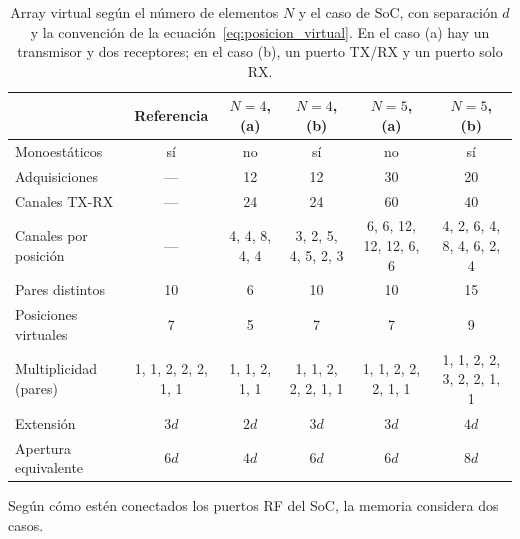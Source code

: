 \documentclass[11pt,a4paper]{article}
\begin{document}
\begin{table}[!htb]
    \centering
    \caption{Array virtual según el número de elementos $N$ y el caso de SoC, con separación $d$ y la
    convención de la ecuación~\eqref{eq:posicion_virtual}. En el caso (a) hay un transmisor y dos
    receptores; en el caso (b), un puerto TX/RX y un puerto solo RX.}
    \label{tab:n_elementos}
    {\small\setlength{\tabcolsep}{4pt}
    \begin{tabularx}{\textwidth}{X c c c c c}
        \toprule
        & Referencia \cite{carretero2027vpa} & $N = 4$, (a) & $N = 4$, (b) & $N = 5$, (a) & $N = 5$, (b) \\
        \midrule
        Monoestáticos & sí & no & sí & no & sí \\
        Adquisiciones & --- & 12 & 12 & 30 & 20 \\
        Canales TX-RX & --- & 24 & 24 & 60 & 40 \\
        Canales por posición & --- & {\footnotesize 4, 4, 8, 4, 4} & {\footnotesize 3, 2, 5, 4, 5, 2, 3} & {\footnotesize 6, 6, 12, 12, 12, 6, 6} & {\footnotesize 4, 2, 6, 4, 8, 4, 6, 2, 4} \\
        Pares distintos & 10 & 6 & 10 & 10 & 15 \\
        Posiciones virtuales & 7 & 5 & 7 & 7 & 9 \\
        Multiplicidad (pares) & {\footnotesize 1, 1, 2, 2, 2, 1, 1} & {\footnotesize 1, 1, 2, 1, 1} & {\footnotesize 1, 1, 2, 2, 2, 1, 1} & {\footnotesize 1, 1, 2, 2, 2, 1, 1} & {\footnotesize 1, 1, 2, 2, 3, 2, 2, 1, 1} \\
        Extensión & $3d$ & $2d$ & $3d$ & $3d$ & $4d$ \\
        Apertura equivalente & $6d$ & $4d$ & $6d$ & $6d$ & $8d$ \\
        \bottomrule
    \end{tabularx}}
\end{table}

Según cómo estén conectados los puertos RF del SoC, la memoria considera dos casos.
\end{document}
